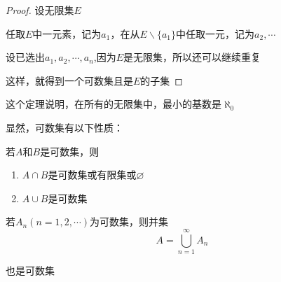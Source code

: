 \begin{proof}
    设无限集$E$

    任取$E$中一元素，记为$a_1$，在从$E\backslash \{a_1\}$中任取一元，记为$a_2,\cdots$

    设已选出$a_1,a_2,\cdots,a_n$,因为$E$是无限集，所以还可以继续重复

    这样，就得到一个可数集且是$E$的子集

    \qde
\end{proof}

这个定理说明，在所有的无限集中，最小的基数是$\aleph_0$

显然，可数集有以下性质：

若$A$和$B$是可数集，则

\begin{enumerate}
    \item $A\cap B$是可数集或有限集或$\varnothing$
    \item $A\cup B$是可数集
\end{enumerate}

\begin{theorem}
    \label{th:countableCupIscountable}
    若$A_n(n=1,2,\cdots)$为可数集，则并集
    \[A=\bigcup_{n=1}^{\infty} A_n\]

    也是可数集
\end{theorem}

